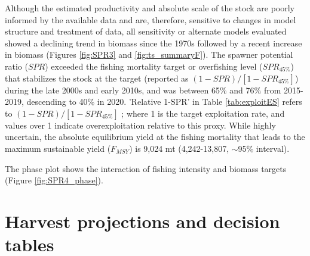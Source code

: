 \documentclass[11pt,
  english,
  a4paper,
]{article}
\begin{document}
Although the estimated productivity and absolute scale of the stock are poorly informed by the available data and are, therefore, sensitive to changes in model structure and treatment of data, all sensitivity or alternate models evaluated showed a declining trend in biomass since the 1970s followed by a recent increase in biomass (Figures \ref{fig:SPR3} and \ref{fig:ts_summaryF}). The spawner potential ratio ($SPR$)  exceeded the fishing mortality target or overfishing level ($SPR_{45\%}$) that stabilizes the stock at the target (reported as $(1-SPR)/[1-SPR_{45\%}]$) during the late 2000s and early 2010s, and was between  65\% and 76\% from 2015-2019, descending to 40\% in 2020.
'Relative 1-SPR' in Table \ref{tab:exploitES} refers to $(1-SPR)/[1-SPR_{45\%}]$ ; where 1 is the target exploitation rate, and values over 1 indicate overexploitation relative to this proxy. While highly uncertain, the
absolute equilibrium yield at the fishing mortality that leads to the maximum sustainable yield ($F_{MSY}$) is 9,024 mt (4,242-13,807, $\sim$95\% interval).


The phase plot shows the interaction of fishing intensity and biomass targets (Figure \ref{fig:SPR4_phase}).

\leavevmode\tagmcend\tagstructend\par


\hypertarget{harvest-projections-and-decision-tables}{%
\section{Harvest projections and decision tables}\label{harvest-projections-and-decision-tables}}

\leavevmode\tagmcend\tagstructend
\end{document}
